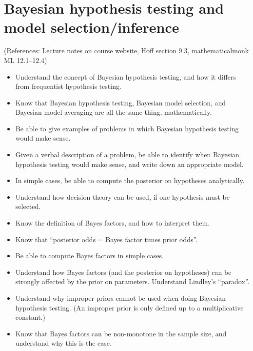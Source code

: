 \documentclass[12pt]{article}
\begin{document}
\section{Bayesian hypothesis testing and model selection/inference}
(References: Lecture notes on course website, Hoff section 9.3, mathematicalmonk ML 12.1--12.4)
\begin{itemize}
\setlength\itemsep{0em}
\item Understand the concept of Bayesian hypothesis testing, and how it differs from frequentist hypothesis testing.
\item Know that Bayesian hypothesis testing, Bayesian model selection, and Bayesian model averaging are all the same thing, mathematically.
\item Be able to give examples of problems in which Bayesian hypothesis testing would make sense.
\item Given a verbal description of a problem, be able to identify when Bayesian hypothesis testing would make sense, and write down an appropriate model.
\item In simple cases, be able to compute the posterior on hypotheses analytically.
\item Understand how decision theory can be used, if one hypothesis must be selected.
\item Know the definition of Bayes factors, and how to interpret them.
\item Know that ``posterior odds = Bayes factor times prior odds''.
\item Be able to compute Bayes factors in simple cases.
\item Understand how Bayes factors (and the posterior on hypotheses) can be strongly affected by the prior on parameters. Understand Lindley's ``paradox''.
\item Understand why improper priors cannot be used when doing Bayesian hypothesis testing. (An improper prior is only defined up to a multiplicative constant.)
\item Know that Bayes factors can be non-monotone in the sample size, and understand why this is the case.
\end{itemize}
\end{document}
